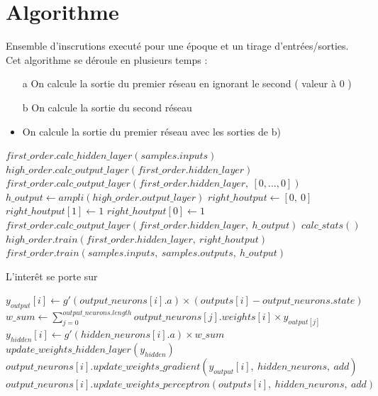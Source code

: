 \documentclass[a4paper,12pt, twoside]{article}
\begin{document}



\newpage
\appendix
\section{Algorithme}

Ensemble d'inscrutions executé pour une époque et un tirage d'entrées/sorties.
\newline
Cet algorithme se déroule en plusieurs temps :
\begin{itemize}
 \item[a] On calcule la sortie du premier réseau en ignorant le second ( valeur à 0 )
 \item[b] On calcule la sortie du second réseau
 \item On calcule la sortie du premier réseau avec les sorties de b)
\end{itemize}


\begin{algorithmic}

\State $first\_order.calc\_hidden\_layer(samples.inputs)$
\State $high\_order.calc\_output\_layer(first\_order.hidden\_layer)$
\State $first\_order.calc\_output\_layer(first\_order.hidden\_layer,\ [0, ..., 0])$
\State 
\State $h\_output \gets ampli(high\_order.output\_layer)$
\State $right\_houtput \gets [0,\ 0]$
  \State $right\_houtput[1] \gets 1$
\Else
  \State $right\_houtput[0] \gets 1$
\EndIf
\State $first\_order.calc\_output\_layer(first\_order.hidden\_layer,\ h\_output)$
\State
\State $calc\_stats()$
\State
\State $high\_order.train(first\_order.hidden\_layer,\ right\_houtput)$
\State $first\_order.train(samples.inputs,\ samples.outputs,\ h\_output)$


\end{algorithmic}

L'interêt se porte sur

\begin{algorithmic}

\State $y_{output}[i] \gets g'(output\_neurons[i].a) \times ( outputs[i] - output\_neurons.state )$
\EndFor
\\
\State $w\_sum \gets \sum \limits_{j=0}^{output\_neurons.length} output\_neurons[j].weights[i] \times y_{output[j]}$
\State $y_{hidden}[i] \gets g'(hidden\_neurons[i].a) \times w\_sum$
\EndFor
\State $update\_weights\_hidden\_layer(y_{hidden})$
\\
\State $output\_neurons[i].update\_weights\_gradient(y_{output}[i],\ hidden\_neurons,\ add)$
\State $output\_neurons[i].update\_weights\_perceptron(outputs[i],\ hidden\_neurons,\ add)$
\EndFor
\EndFunction

\end{algorithmic}
\end{document}

